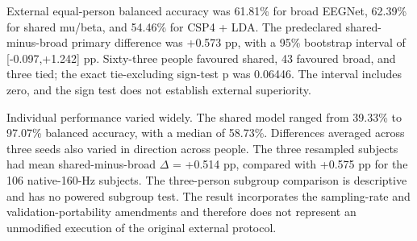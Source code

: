 \documentclass[11pt]{article}
\begin{document}
External equal-person balanced accuracy was 61.81\% for broad EEGNet, 62.39\% for shared mu/beta, and 54.46\% for CSP4 + LDA. The predeclared shared-minus-broad primary difference was +0.573 pp, with a 95\% bootstrap interval of [-0.097,+1.242] pp. Sixty-three people favoured shared, 43 favoured broad, and three tied; the exact tie-excluding sign-test p was 0.06446. The interval includes zero, and the sign test does not establish external superiority.

Individual performance varied widely. The shared model ranged from 39.33\% to 97.07\% balanced accuracy, with a median of 58.73\%. Differences averaged across three seeds also varied in direction across people. The three resampled subjects had mean shared-minus-broad $\Delta$ = +0.514 pp, compared with +0.575 pp for the 106 native-160-Hz subjects. The three-person subgroup comparison is descriptive and has no powered subgroup test. The result incorporates the sampling-rate and validation-portability amendments and therefore does not represent an unmodified execution of the original external protocol.
\end{document}
